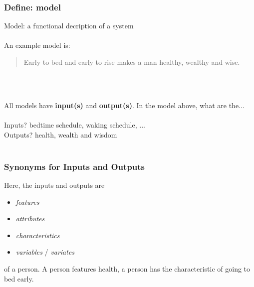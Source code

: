 \documentclass[slides]{beamer} %
\begin{document}
\begin{frame}\frametitle{Define: model}

Model: a functional decription of a system  \pause \\~\\ An example model is:

\begin{quotation}
Early to bed and early to rise makes a man healthy, wealthy and wise. \pause 
\end{quotation}

 \\~\\  \pause 

All models have \textbf{input(s)} and \textbf{output(s)}. In the model above, what are the... \\~\\

Inputs? \pause bedtime schedule, waking schedule, ... \\
Outputs? \pause health, wealth and wisdom \\~\\

\end{frame}


\begin{frame}\frametitle{Synonyms for Inputs and Outputs}

\small
Here, the inputs and outputs are 

\begin{itemize}
\item \textit{features} 
\item \textit{attributes} 
\item \textit{characteristics}
\item \textit{variables} / \textit{variates}
\end{itemize}

of a person.  \pause A person features health, a person has the characteristic of going to bed early. 


\end{frame}
\end{document}
